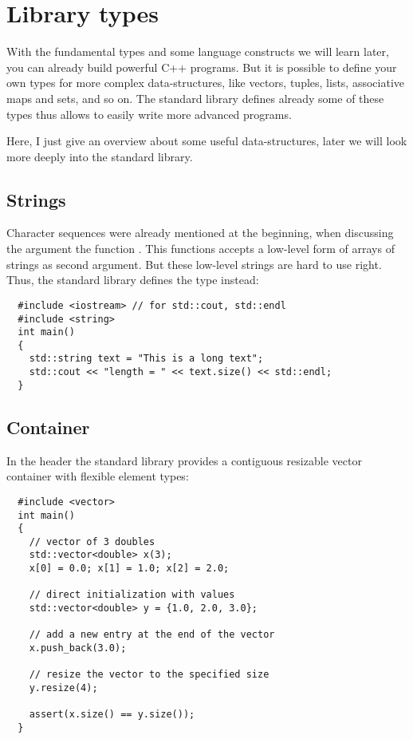 \section{Library types}
With the fundamental types and some language constructs we will learn later, you can already build powerful C++ programs. But it is possible
to define your own types for more complex data-structures, like vectors, tuples, lists, associative maps and sets, and so on. The standard library
defines already some of these types thus allows to easily write more advanced programs.

Here, I just give an overview about some useful data-structures, later we will look more deeply into the standard library.

\subsection{Strings}
Character sequences were already mentioned at the beginning, when discussing the argument the function . This
functions accepts a low-level form of arrays of strings as second argument. But these low-level strings are hard to use right. Thus,
the standard library defines the type  instead:
\begin{verbatim}
  #include <iostream> // for std::cout, std::endl
  #include <string>
  int main()
  {
    std::string text = "This is a long text";
    std::cout << "length = " << text.size() << std::endl;
  }
\end{verbatim}

\subsection{Container}
In the header  the standard library provides a contiguous resizable vector container with flexible element types:
\begin{verbatim}
  #include <vector>
  int main()
  {
    // vector of 3 doubles
    std::vector<double> x(3);
    x[0] = 0.0; x[1] = 1.0; x[2] = 2.0;

    // direct initialization with values
    std::vector<double> y = {1.0, 2.0, 3.0};

    // add a new entry at the end of the vector
    x.push_back(3.0);

    // resize the vector to the specified size
    y.resize(4);

    assert(x.size() == y.size());
  }
\end{verbatim}

